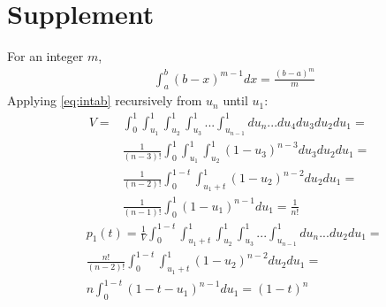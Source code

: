 \documentclass{llncs}
\begin{document}


\newcommand{\beginsupplement}{%
        \setcounter{table}{0}
        \renewcommand{\thetable}{S\arabic{table}}%
        \setcounter{figure}{0}
        \renewcommand{\thefigure}{S\arabic{figure}}
        \setcounter{equation}{0}
        \renewcommand{\theequation}{S\arabic{equation}}%
     }
\section*{Supplement}
\beginsupplement

For an integer $m$,
\begin{eqnarray}
&\displaystyle \int_a^b\left(b-x\right)^{m-1}dx=
\displaystyle \frac{\left(b-a\right)^m}{m}  \label{eq:intab}
\end{eqnarray} 
Applying \ref{eq:intab} recursively from $u_n$ until $u_1$: 
\begin{eqnarray}
V = &\displaystyle \int_0^1\int_{u_1}^1\int_{u_2}^1\int_{u_3}^1...\int_{u_{n-1}}^1 du_n...du_4 du_3 du_2 du_1 = \nonumber \\ 
&\displaystyle \frac{1}{(n-3)!}\int_0^1\int_{u_1}^1\int_{u_2}^1 \left( 1-u_3 \right)^{n-3}du_3 du_2 du_1 = \nonumber \\
&\displaystyle \frac{1}{(n-2)!}\int_0^{1-t}\int_{{u_1}+t}^1\left( 1-u_2 \right)^{n-2} du_2 du_1 = \nonumber \\
&\displaystyle \frac{1}{(n-1)!} \int_0^1\left( 1-u_1 \right)^{n-1} du_1 = \frac{1}{n!} \label{eq:volume}
\end{eqnarray} 
\begin{eqnarray}
& p_1(t) =  \displaystyle \frac{1}{V}\displaystyle \int_0^{1-t}\int_{{u_1}+t}^1\int_{u_2}^1\int_{u_3}^1...\int_{u_{n-1}}^1 du_n...du_2 du_1 =  \nonumber \\ 
&\displaystyle \frac{n!}{(n-2)!}\int_0^{1-t}\int_{{u_1}+t}^1\left( 1-u_2 \right)^{n-2} du_2 du_1 =  \nonumber \\
&\displaystyle n \int_0^{1-t}\left( 1-t-u_1 \right)^{n-1} du_1 = (1-t)^n \label{eq:p_1}
\end{eqnarray}
\end{document}
